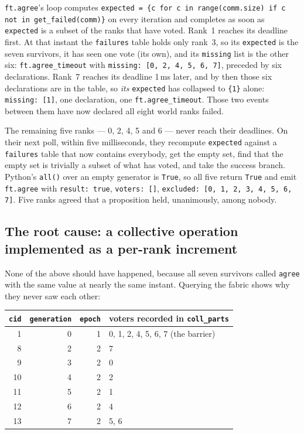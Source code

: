 \documentclass[11pt]{article}
\begin{document}
\texttt{ft.agree}'s loop computes \texttt{expected = \{c for c in range(comm.size) if c
not in get\_failed(comm)\}} on every iteration and completes as soon as
\texttt{expected} is a subset of the ranks that have voted. Rank~1 reaches its deadline
first. At that instant the \texttt{failures} table holds only rank~3, so its
\texttt{expected} is the seven survivors, it has seen one vote (its own), and its
\texttt{missing} list is the other six: \texttt{ft.agree\_timeout} with
\texttt{missing:\ [0, 2, 4, 5, 6, 7]}, preceded by six declarations. Rank~7 reaches its
deadline 1\,ms later, and by then those six declarations are in the table, so \emph{its}
\texttt{expected} has collapsed to \texttt{\{1\}} alone: \texttt{missing:\ [1]}, one
declaration, one \texttt{ft.agree\_timeout}. Those two events between them have now
declared all eight world ranks failed.

The remaining five ranks --- 0, 2, 4, 5 and 6 --- never reach their deadlines. On their
next poll, within five milliseconds, they recompute \texttt{expected} against a
\texttt{failures} table that now contains everybody, get the empty set, find that the
empty set is trivially a subset of what has voted, and take the success branch. Python's
\texttt{all()} over an empty generator is \texttt{True}, so all five return \texttt{True}
and emit \texttt{ft.agree} with \texttt{result:\ true}, \texttt{voters:\ []},
\texttt{excluded:\ [0, 1, 2, 3, 4, 5, 6, 7]}. Five ranks agreed that a proposition held,
unanimously, among nobody.

\subsection{The root cause: a collective operation implemented as a per-rank increment}

None of the above should have happened, because all seven survivors called
\texttt{agree} with the same value at nearly the same instant. Querying the fabric shows
why they never saw each other:

\begin{center}\footnotesize
\begin{tabular}{@{}rrrl@{}}
\toprule
\texttt{cid} & \texttt{generation} & \texttt{epoch} & voters recorded in \texttt{coll\_parts} \\
\midrule
1  & 0 & 1 & 0, 1, 2, 4, 5, 6, 7 \quad(the barrier) \\
8  & 2 & 2 & 7 \\
9  & 3 & 2 & 0 \\
10 & 4 & 2 & 2 \\
11 & 5 & 2 & 1 \\
12 & 6 & 2 & 4 \\
13 & 7 & 2 & 5, 6 \\
\bottomrule
\end{tabular}\normalsize
\end{center}
\end{document}
